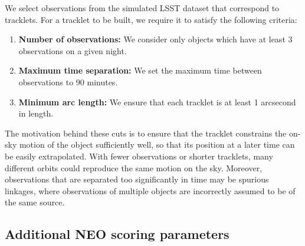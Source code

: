\documentclass[preprint2, twocolappendix]{aastex631}
\begin{document}
We select observations from the simulated LSST dataset that correspond to tracklets. For a tracklet to be built, we require it to satisfy the following criteria:
\begin{enumerate}
    \item \textbf{Number of observations:} We consider only objects which have at least 3 observations on a given night.
    \item \textbf{Maximum time separation:} We set the maximum time between observations to 90 minutes.
    \item \textbf{Minimum arc length:} We ensure that each tracklet is at least 1 arcsecond in length.
\end{enumerate}
The motivation behind these cuts is to ensure that the tracklet constrains the on-sky motion of the object sufficiently well, so that its position at a later time can be easily extrapolated. With fewer observations or shorter tracklets, many different orbits could reproduce the same motion on the sky. Moreover, observations that are separated too significantly in time may be spurious linkages, where observations of multiple objects are incorrectly assumed to be of the same source.

\subsection{Additional NEO scoring parameters}
\end{document}

